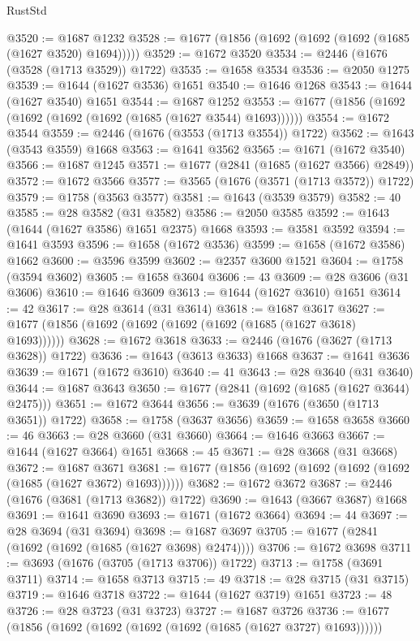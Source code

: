 \begin{lexlean}{RustStd}
\begin{coremodule}
@3520 := @1687 @1232
@3528 := @1677 (@1856 (@1692 (@1692 (@1692 (@1685 (@1627 @3520) @1694)))))
@3529 := @1672 @3520
@3534 := @2446 (@1676 (@3528 (@1713 @3529)) @1722)
@3535 := @1658 @3534
@3536 := @2050 @1275
@3539 := @1644 (@1627 @3536) @1651
@3540 := @1646 @1268
@3543 := @1644 (@1627 @3540) @1651
@3544 := @1687 @1252
@3553 := @1677 (@1856 (@1692 (@1692 (@1692 (@1692 (@1685 (@1627 @3544) @1693))))))
@3554 := @1672 @3544
@3559 := @2446 (@1676 (@3553 (@1713 @3554)) @1722)
@3562 := @1643 (@3543 @3559) @1668
@3563 := @1641 @3562
@3565 := @1671 (@1672 @3540)
@3566 := @1687 @1245
@3571 := @1677 (@2841 (@1685 (@1627 @3566) @2849))
@3572 := @1672 @3566
@3577 := @3565 (@1676 (@3571 (@1713 @3572)) @1722)
@3579 := @1758 (@3563 @3577)
@3581 := @1643 (@3539 @3579)
@3582 := 40
@3585 := @28 @3582 (@31 @3582)
@3586 := @2050 @3585
@3592 := @1643 (@1644 (@1627 @3586) @1651 @2375) @1668
@3593 := @3581 @3592
@3594 := @1641 @3593
@3596 := @1658 (@1672 @3536)
@3599 := @1658 (@1672 @3586) @1662
@3600 := @3596 @3599
@3602 := @2357 @3600 @1521
@3604 := @1758 (@3594 @3602)
@3605 := @1658 @3604
@3606 := 43
@3609 := @28 @3606 (@31 @3606)
@3610 := @1646 @3609
@3613 := @1644 (@1627 @3610) @1651
@3614 := 42
@3617 := @28 @3614 (@31 @3614)
@3618 := @1687 @3617
@3627 := @1677 (@1856 (@1692 (@1692 (@1692 (@1692 (@1685 (@1627 @3618) @1693))))))
@3628 := @1672 @3618
@3633 := @2446 (@1676 (@3627 (@1713 @3628)) @1722)
@3636 := @1643 (@3613 @3633) @1668
@3637 := @1641 @3636
@3639 := @1671 (@1672 @3610)
@3640 := 41
@3643 := @28 @3640 (@31 @3640)
@3644 := @1687 @3643
@3650 := @1677 (@2841 (@1692 (@1685 (@1627 @3644) @2475)))
@3651 := @1672 @3644
@3656 := @3639 (@1676 (@3650 (@1713 @3651)) @1722)
@3658 := @1758 (@3637 @3656)
@3659 := @1658 @3658
@3660 := 46
@3663 := @28 @3660 (@31 @3660)
@3664 := @1646 @3663
@3667 := @1644 (@1627 @3664) @1651
@3668 := 45
@3671 := @28 @3668 (@31 @3668)
@3672 := @1687 @3671
@3681 := @1677 (@1856 (@1692 (@1692 (@1692 (@1692 (@1685 (@1627 @3672) @1693))))))
@3682 := @1672 @3672
@3687 := @2446 (@1676 (@3681 (@1713 @3682)) @1722)
@3690 := @1643 (@3667 @3687) @1668
@3691 := @1641 @3690
@3693 := @1671 (@1672 @3664)
@3694 := 44
@3697 := @28 @3694 (@31 @3694)
@3698 := @1687 @3697
@3705 := @1677 (@2841 (@1692 (@1692 (@1685 (@1627 @3698) @2474))))
@3706 := @1672 @3698
@3711 := @3693 (@1676 (@3705 (@1713 @3706)) @1722)
@3713 := @1758 (@3691 @3711)
@3714 := @1658 @3713
@3715 := 49
@3718 := @28 @3715 (@31 @3715)
@3719 := @1646 @3718
@3722 := @1644 (@1627 @3719) @1651
@3723 := 48
@3726 := @28 @3723 (@31 @3723)
@3727 := @1687 @3726
@3736 := @1677 (@1856 (@1692 (@1692 (@1692 (@1692 (@1685 (@1627 @3727) @1693))))))

\end{coremodule}
\end{lexlean}
